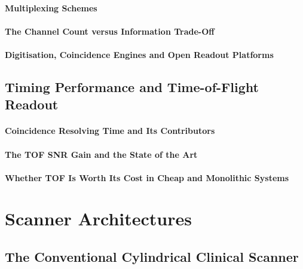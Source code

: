 \paragraph{Multiplexing Schemes}

\paragraph{The Channel Count versus Information Trade-Off}

\paragraph{Digitisation, Coincidence Engines and Open Readout Platforms}

\subsection{Timing Performance and Time-of-Flight Readout}
\label{sec:tof-readout}

\paragraph{Coincidence Resolving Time and Its Contributors}

\paragraph{The TOF SNR Gain and the State of the Art}

\paragraph{Whether TOF Is Worth Its Cost in Cheap and Monolithic Systems}

\section{Scanner Architectures}
\label{sec:architectures}

\subsection{The Conventional Cylindrical Clinical Scanner}
\label{sec:cylindrical}

